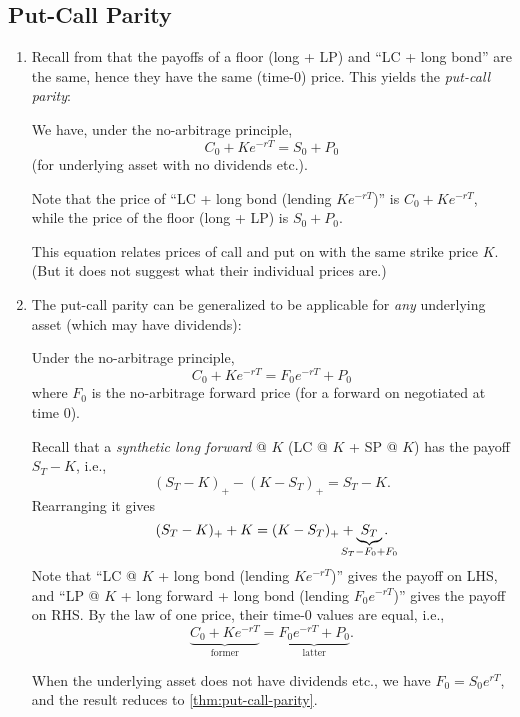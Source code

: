 \subsection{Put-Call Parity}
\label{subsect:put-call-parity}
\begin{enumerate}
\item Recall from  that the payoffs of a floor
(long  + LP) and ``LC + long bond'' are the same, hence they
have the same (time-0) price. This yields the \emph{put-call parity}:
\begin{theorem}
\label{thm:put-call-parity}
We have, under the no-arbitrage principle,
\[
C_0+Ke^{-rT}=S_0+P_0
\]
(for underlying asset  with no dividends etc.).
\end{theorem}
\begin{pf}
Note that the price of ``LC + long bond (lending \(Ke^{-rT}\))'' is
\(C_0+Ke^{-rT}\), while the price of the floor (long  + LP)
is \(S_0+P_0\).
\end{pf}

This equation relates prices of call and put on  with the
same strike price \(K\). (But it does not suggest what their individual prices
are.)

\item The put-call parity can be generalized to be applicable for \emph{any}
underlying asset (which may have dividends):
\begin{theorem}
\label{thm:gen-put-call-parity}
Under the no-arbitrage principle,
\[
C_0+Ke^{-rT}=F_0e^{-rT}+P_0
\]
where \(F_0\) is the no-arbitrage forward price (for a forward on  negotiated at time 0).  \end{theorem}
\begin{pf}
Recall that a \emph{synthetic long forward} @ \(K\) (LC @ \(K\) + SP @ \(K\))
has the payoff \(S_T-K\), i.e.,
\[
(S_T-K)_{+}-(K-S_T)_{+}=S_T-K.
\]
Rearranging it gives
\[
(S_T-K)_{+}+K=(K-S_T)_{+}+\underbrace{S_T}_{\mathclap{S_T-F_0+F_0}}.
\]
Note that ``LC @ \(K\) + long bond (lending \(Ke^{-rT}\))'' gives the payoff on
LHS, and ``LP @ \(K\) + long forward + long bond (lending \(F_0e^{-rT}\))''
gives the payoff on RHS. By the law of one price, their time-0 values are
equal, i.e.,
\[
\underbrace{C_0+Ke^{-rT}}_{\text{former}}=\underbrace{F_0e^{-rT}+P_0}_{\text{latter}}.
\]
\end{pf}

\begin{note}
When the underlying asset  does not have dividends etc., we
have \(F_0=S_0e^{rT}\), and the result reduces to \cref{thm:put-call-parity}.
\end{note}


\end{enumerate}
